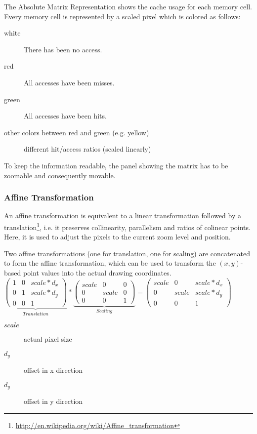 The Absolute Matrix Representation shows the cache usage for each memory cell. Every memory cell is represented by a scaled pixel which is colored as follows:
\begin{description}
\item[white]There has been no access.
\item[red]All accesses have been misses.
\item[green]All accesses have been hits.
\item[other colors between red and green (e.g. yellow)]different hit/access ratios (scaled linearly)
\end{description}
To keep the information readable, the panel showing the matrix has to be zoomable and consequently movable.

\subsubsection{Affine Transformation}
An affine transformation is equivalent to a linear transformation followed by a translation\footnote{\url{http://en.wikipedia.org/wiki/Affine_transformation}}, i.e. it preserves collinearity, parallelism and ratios of colinear points. Here, it is used to adjust the pixels to the current zoom level and position.

Two affine transformations (one for translation, one for scaling) are concatenated to form the affine transformation, which can be used to transform the $(x,y)$-based point values into the actual drawing coordinates.\\

$\underbrace {\left(
   \begin{array}{ccc}
     1 & 0 & scale*d_{x} \\
     0 & 1 & scale*d_{y} \\
     0 & 0 & 1
   \end{array}
\right)}_{Translation}*\underbrace {\left(
   \begin{array}{ccc}
     scale & 0 & 0 \\
     0 & scale & 0 \\
     0 & 0 & 1
   \end{array}
\right)}_{Scaling}=\left(
   \begin{array}{ccc}
     scale & 0 & scale*d_{x} \\
     0 & scale & scale*d_{y} \\
     0 & 0 & 1
   \end{array}
\right)$
\begin{description}
\item[$scale$]actual pixel size
\item[$d_{y}$]offset in x direction
\item[$d_{y}$]offset in y direction
\end{description}


